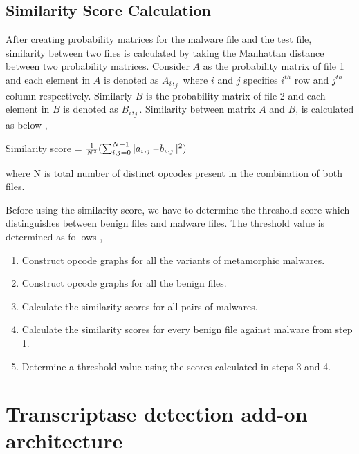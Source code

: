 \subsection{Similarity Score Calculation}  \label{opcodescorecalculation}
After creating probability matrices for the malware file and the test file, similarity between two files is calculated by taking the Manhattan distance between two probability matrices. Consider $A$ as the probability matrix of file 1 and each element in $A$ is denoted as $A_i,_j$ where $i$ and $j$ specifies $i^{th}$ row and $j^{th}$ column respectively. Similarly $B$ is the probability matrix of file 2 and each element in $B$ is denoted as $B_i,_j$. Similarity between matrix $A$ and $B$, is calculated as below \cite{bib8},

Similarity score = ${1 \over N^2}(\sum_{i,j=0}^{N-1}|a_i,_j-b_i,_j|^2)$ 

where N is total number of distinct opcodes present in the combination of both files.

Before using the similarity score, we have to determine the threshold score which distinguishes between benign files and malware files. The threshold value is determined as follows \cite{bib8},
\begin{enumerate}
\item Construct opcode graphs for all the variants of metamorphic malwares.
\item Construct opcode graphs for all the benign files.
\item Calculate the similarity scores for all pairs of malwares.
\item Calculate the similarity scores for every benign file against malware from step 1.
\item Determine a threshold value using the scores calculated in steps 3 and 4.
\end{enumerate}

\section{Transcriptase detection add-on architecture}

